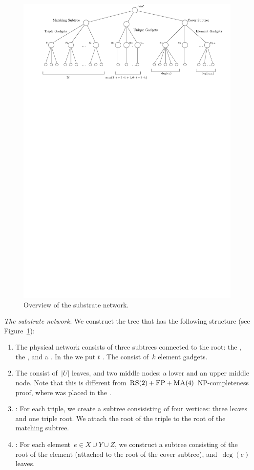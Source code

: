 \begin{figure}[t]
  \centering
  \includegraphics[width=0.9\columnwidth]{figs/static-mapping/overview2}
  \caption{Overview of the substrate network.}
  \label{fig:overview2}
\end{figure}


\emph{The substrate network.}
We construct the tree that has the following structure (see Figure~\ref{fig:overview2}):

\begin{enumerate}
  \item The physical network consists of three subtrees connected to
  the root: the {\MatchSubtree}, the {\CoverSubtree}, and a
  {\UnqSubtree}. In the {\MatchSubtree} we put $t$
  {\TripleGadgets}. The {\CoverSubtree} consist of~$k$ element gadgets.
  \item The {\UnqSubtree} consist of~$|U|$ leaves, and two middle nodes:
  a lower and an upper middle node. Note that this is different from $\textsc{RS}(2)+\textsc{FP}+\textsc{MA}(4)$ NP-completeness proof, where {\UnqSubtree} was placed in the {\MatchSubtree}.
  \item \TripleGadget: For each triple, we create a subtree
  consisisting of four vertices: three leaves and one triple root.  We
  attach the root of the triple to the root of the matching subtree.
  \item \ElGadget: For each element~$e \in X\cup Y\cup Z$, we
  construct a subtree consisting of the root of the element (attached
  to the root of the cover subtree), and~$\deg(e)$ leaves.
\end{enumerate}

